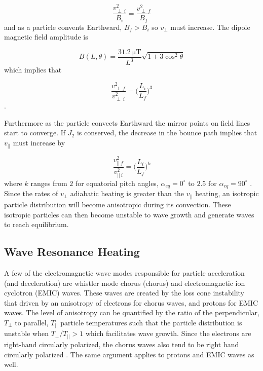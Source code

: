 \begin{equation}
\frac{v^2_{\perp \ i}}{B_i} = \frac{v^2_{\perp \ f}}{B_f}
\end{equation} and as a particle convents Earthward, $B_f > B_i$ so $v_\perp$ must increase. The dipole magnetic field amplitude is 

\begin{equation}
B(L, \theta) = \frac{31.2 \ \mathrm{\mu T}}{L^3}\sqrt{1 + 3 \cos^2 \theta}
\end{equation} which implies that 

\begin{equation}
\frac{v_{\perp \ f}^2}{v_{\perp \ i}^2} = \bigg( \frac{L_i}{L_f} \bigg)^3
\end{equation}.

Furthermore as the particle convects Earthward the mirror points on field lines start to converge. If $J_2$ is conserved, the decrease in the bounce path implies that $v_{||}$ must increase by 

\begin{equation}
\frac{v_{|| \ f}^2}{v_{|| \ i}^2} = \bigg( \frac{L_i}{L_f} \bigg)^k
\end{equation} where $k$ ranges from $2$ for equatorial pitch angles, $\alpha_{eq} = 0^\circ$ to $2.5$ for $\alpha_{eq} = 90^\circ$ \citep{Baumjohann1997}. Since the rates of $v_\perp$ adiabatic heating is greater than the $v_{||}$ heating, an isotropic particle distribution will become anisotropic during its convection. These isotropic particles can then become unstable to wave growth and generate waves to reach equilibrium.


\subsection{Wave Resonance Heating}\label{Intro:wave_heating}
A few of the electromagnetic wave modes responsible for particle acceleration (and deceleration) are whistler mode chorus (chorus) and electromagnetic ion cyclotron (EMIC) waves. These waves are created by the loss cone instability that driven by an anisotropy of electrons for chorus waves, and protons for EMIC waves. The level of anisotropy can be quantified by the ratio of the perpendicular, $T_\perp$ to parallel, $T_{||}$ particle temperatures such that the particle distribution is unstable when $T_\perp/T_{||} > 1$ which facilitates wave growth. Since the electrons are right-hand circularly polarized, the chorus waves also tend to be right hand circularly polarized \citep{Tsurutani1997}. The same argument applies to protons and EMIC waves as well. 

